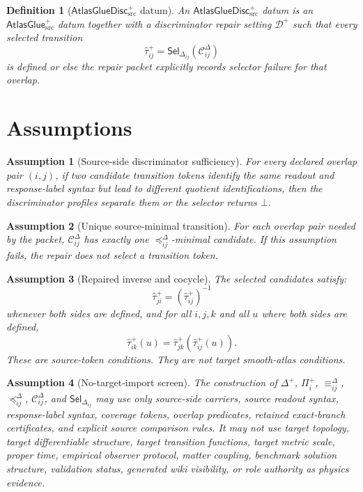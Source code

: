 \documentclass[11pt]{article}
\newcommand{\AtlasGlue}{\mathsf{AtlasGlue}_{\mathrm{src}}^{+}}
\newcommand{\AtlasGlueDisc}{\mathsf{AtlasGlueDisc}_{\mathrm{src}}^{+}}
\newcommand{\Disc}{\Delta^{+}}
\newcommand{\Prof}{\Pi^{+}}
\newcommand{\Cand}{\mathcal{C}^{\Delta}}
\newcommand{\Sel}{\mathsf{Sel}_{\Delta}}
\newtheorem{definition}{Definition}
\newtheorem{assumption}{Assumption}
\begin{document}
\begin{definition}[\(\AtlasGlueDisc\) datum]
An \(\AtlasGlueDisc\) datum is an \(\AtlasGlue\) datum together with a
discriminator repair setting \(\mathcal D^+\) such that every selected
transition
\[
  \widehat{\tau}_{ij}^+ = \Sel_{ij}(\Cand_{ij})
\]
is defined or else the repair packet explicitly records selector failure for
that overlap.
\end{definition}

\section{Assumptions}

\begin{assumption}[Source-side discriminator sufficiency]
For every declared overlap pair \((i,j)\), if two candidate transition tokens
identify the same readout and response-label syntax but lead to different
quotient identifications, then the discriminator profiles separate them or
the selector returns \(\bot\).
\end{assumption}

\begin{assumption}[Unique source-minimal transition]
For each overlap pair needed by the packet, \(\Cand_{ij}\) has exactly one
\(\preceq_{ij}^{\Delta}\)-minimal candidate. If this assumption fails, the
repair does not select a transition token.
\end{assumption}

\begin{assumption}[Repaired inverse and cocycle]
The selected candidates satisfy:
\[
  \widehat{\tau}_{ji}^+=(\widehat{\tau}_{ij}^+)^{-1}
\]
whenever both sides are defined, and for all \(i,j,k\) and all \(u\) where
both sides are defined,
\[
  \widehat{\tau}_{ik}^+(u)=
  \widehat{\tau}_{jk}^+(\widehat{\tau}_{ij}^+(u)).
\]
These are source-token conditions. They are not target smooth-atlas
conditions.
\end{assumption}

\begin{assumption}[No-target-import screen]
The construction of \(\Disc\), \(\Prof_i\), \(\equiv_{ij}^{\Delta}\),
\(\preceq_{ij}^{\Delta}\), \(\Cand_{ij}\), and \(\Sel_{ij}\) may use only
source-side carriers, source readout syntax, response-label syntax, coverage
tokens, overlap predicates, retained exact-branch certificates, and explicit
source comparison rules. It may not use target topology, target differentiable
structure, target transition functions, target metric scale, proper time,
empirical observer protocol, matter coupling, benchmark solution structure,
validation status, generated wiki visibility, or role authority as physics
evidence.
\end{assumption}
\end{document}
